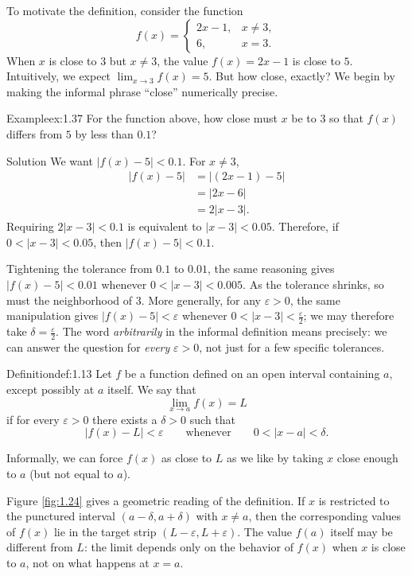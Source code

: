\documentclass[a4paper,12pt,oneside]{memoir}
\begin{document}
To motivate the definition, consider the function \[ f(x) = \begin{cases} 2x - 1, & x \neq 3,\\[4pt] 6, & x = 3. \end{cases} \] When \(x\) is close to \(3\) but \(x \neq 3\), the value \(f(x) = 2x - 1\) is close to \(5\). Intuitively, we expect \(\lim_{x \to 3} f(x) = 5\). But how close, exactly? We begin by making the informal phrase “close” numerically precise.

\begin{workedexample}
\begin{envexample}{Example}{ex:1.37}{}
For the function above, how close must \(x\) be to \(3\) so that \(f(x)\) differs from \(5\) by less than \(0.1\)?
\end{envexample}
\begin{envsolution}{Solution}{}{}
We want \(|f(x) - 5| < 0.1\). For \(x \neq 3\), \[ \begin{aligned} |f(x) - 5| &= |(2x - 1) - 5|\\ &= |2x - 6|\\ &= 2 |x - 3|. \end{aligned} \] Requiring \(2 |x - 3| < 0.1\) is equivalent to \(|x - 3| < 0.05\). Therefore, if \(0 < |x - 3| < 0.05\), then \(|f(x) - 5| < 0.1\).
\end{envsolution}
\end{workedexample}
Tightening the tolerance from \(0.1\) to \(0.01\), the same reasoning gives \(|f(x) - 5| < 0.01\) whenever \(0 < |x - 3| < 0.005\). As the tolerance shrinks, so must the neighborhood of \(3\). More generally, for any \(\varepsilon > 0\), the same manipulation gives \(|f(x) - 5| < \varepsilon\) whenever \(0 < |x - 3| < \tfrac{\varepsilon}{2}\); we may therefore take \(\delta = \tfrac{\varepsilon}{2}\). The word \emph{arbitrarily} in the informal definition means precisely: we can answer the question for \emph{every} \(\varepsilon > 0\), not just for a few specific tolerances.

\begin{envdefinition}{Definition}{def:1.13}{}
Let \(f\) be a function defined on an open interval containing \(a\), except possibly at \(a\) itself. We say that \[ \lim_{x \to a} f(x) = L \] if for every \(\varepsilon > 0\) there exists a \(\delta > 0\) such that \[ |f(x) - L| < \varepsilon \qquad \text{whenever} \qquad 0 < |x - a| < \delta. \]

\begin{informal}
Informally, we can force \(f(x)\) as close to \(L\) as we like by taking \(x\) close enough to \(a\) (but not equal to \(a\)).
\end{informal}
\end{envdefinition}
Figure \ref{fig:1.24} gives a geometric reading of the definition. If \(x\) is restricted to the punctured interval \((a - \delta, a + \delta)\) with \(x \neq a\), then the corresponding values of \(f(x)\) lie in the target strip \((L - \varepsilon, L + \varepsilon)\). The value \(f(a)\) itself may be different from \(L\): the limit depends only on the behavior of \(f(x)\) when \(x\) is close to \(a\), not on what happens at \(x = a\).
\end{document}
